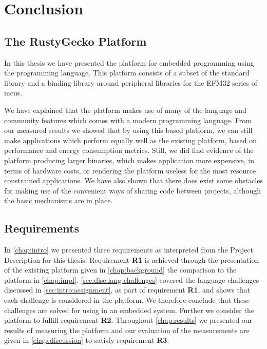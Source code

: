 
\chapter{Conclusion}
\label{chap:conclusion}

\section{The RustyGecko Platform}

In this thesis we have presented the {\rg} platform for embedded programming using the {\rust} programming language.
This platform consists of a subset of the {\rust} standard library and a binding library around peripheral libraries for the EFM32 series of \glspl{mcu}.

We have explained that the platform makes use of many of the language and community features which comes with a modern programming language.
From our measured results we showed that by using this {\rust} based platform, we can still make applications which perform equally well as the existing {\C} platform, based on performance and energy consumption metrics.
Still, we did find evidence of the platform producing larger binaries, which makes {\rust} application more expensive, in terms of hardware costs, or rendering the platform useless for the most resource constrained applications.
We have also shown that there does exist some obstacles for making use of the convenient ways of sharing code between projects, although the basic mechanisms are in place.

\section{Requirements}

In \autoref{chap:intro} we presented three requirements as interpreted from the Project Description for this thesis.
Requirement \textbf{R1} is achieved through the presentation of the existing {\C} platform given in \autoref{chap:background} the comparison to the {\rust} platform in \autoref{chap:impl}.
\autoref{sec:disc:lang-challenges} covered the language challenges discussed in \autoref{sec:intro:assignment}, as part of requirement \textbf{R1}, and shows that each challenge is considered in the {\rg} platform.
We therefore conclude that these challenges are solved for using {\rust} in an embedded system.
Further we consider the {\rg} platform to fulfill requirement \textbf{R2}.
Throughout \autoref{chap:results} we presented our results of measuring the {\rg} platform and our evaluation of the measurements are given in \autoref{chap:discussion} to satisfy requirement \textbf{R3}.

